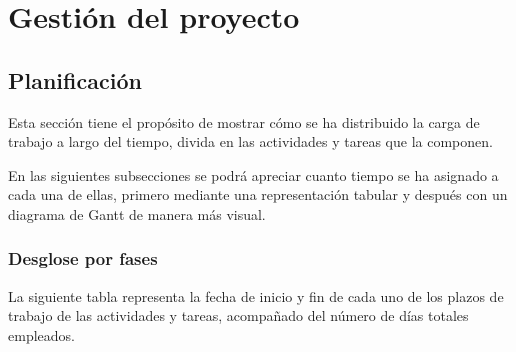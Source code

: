 \chapter{Gestión del proyecto}
\label{ch:gestion}
\section{Planificación}
Esta sección tiene el propósito de mostrar cómo se ha distribuido la carga de trabajo a largo del tiempo, divida en las actividades y tareas que la componen.

En las siguientes subsecciones se podrá apreciar cuanto tiempo se ha asignado a cada una de ellas, primero mediante una representación tabular y después con un diagrama de Gantt de manera más visual.

\subsection{Desglose por fases}
La siguiente tabla representa la fecha de inicio y fin de cada uno de los plazos de trabajo de las actividades y tareas, acompañado del número de días totales empleados.

